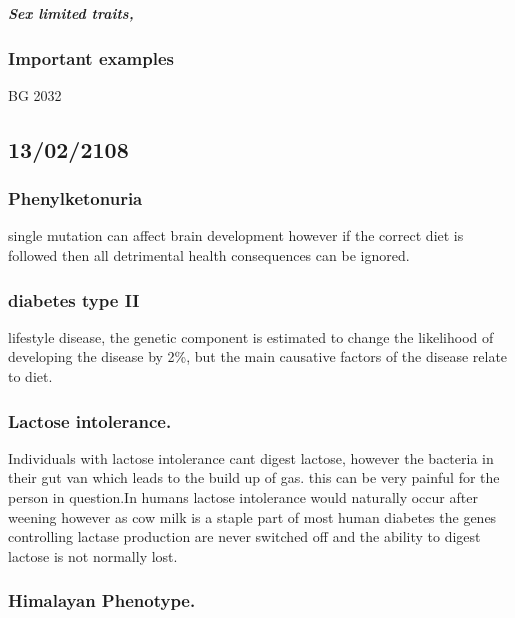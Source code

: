 \documentclass[]{article}
\let\oldsubparagraph\subparagraph
\renewcommand{\subparagraph}[1]{\oldsubparagraph{#1}\mbox{}}
\begin{document}
\hypertarget{sex-limited-traits}{%
\subparagraph{Sex limited traits,}\label{sex-limited-traits}}

\hypertarget{important-examples}{%
\subsubsection{Important examples}\label{important-examples}}

BG 2032

\hypertarget{section}{%
\subsection{13/02/2108}\label{section}}

\hypertarget{phenylketonuria}{%
\subsubsection{Phenylketonuria}\label{phenylketonuria}}

single mutation can affect brain development however if the correct diet
is followed then all detrimental health consequences can be ignored.

\hypertarget{diabetes-type-ii}{%
\subsubsection{diabetes type II}\label{diabetes-type-ii}}

lifestyle disease, the genetic component is estimated to change the
likelihood of developing the disease by 2\%, but the main causative
factors of the disease relate to diet.

\hypertarget{lactose-intolerance.}{%
\subsubsection{Lactose intolerance.}\label{lactose-intolerance.}}

Individuals with lactose intolerance cant digest lactose, however the
bacteria in their gut van which leads to the build up of gas. this can
be very painful for the person in question.In humans lactose intolerance
would naturally occur after weening however as cow milk is a staple part
of most human diabetes the genes controlling lactase production are
never switched off and the ability to digest lactose is not normally
lost.

\hypertarget{himalayan-phenotype.}{%
\subsubsection{Himalayan Phenotype.}\label{himalayan-phenotype.}}
\end{document}
